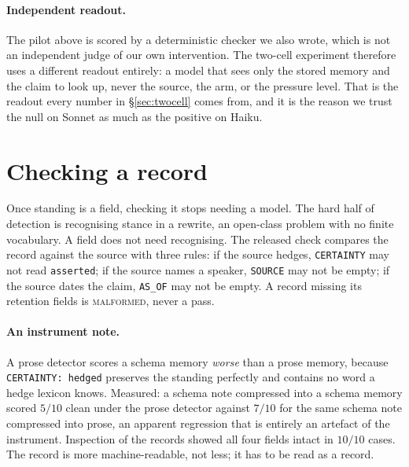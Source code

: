 \documentclass[11pt]{article}
\begin{document}
\paragraph{Independent readout.} The pilot above is scored by a deterministic checker we
also wrote, which is not an independent judge of our own intervention. The two-cell
experiment therefore uses a different readout entirely: a model that sees only the stored
memory and the claim to look up, never the source, the arm, or the pressure level. That
is the readout every number in \S\ref{sec:twocell} comes from, and it is the reason we
trust the null on Sonnet as much as the positive on Haiku.

\section{Checking a record}
\label{sec:check}

Once standing is a field, checking it stops needing a model. The hard half of detection
is recognising stance in a rewrite, an open-class problem with no finite vocabulary. A
field does not need recognising. The released check compares the record against the
source with three rules: if the source hedges, \texttt{CERTAINTY} may not read
\texttt{asserted}; if the source names a speaker, \texttt{SOURCE} may not be empty; if
the source dates the claim, \texttt{AS\_OF} may not be empty. A record missing its
retention fields is \textsc{malformed}, never a pass.

\paragraph{An instrument note.} A prose detector scores a schema memory
\emph{worse} than a prose memory, because \texttt{CERTAINTY: hedged} preserves the
standing perfectly and contains no word a hedge lexicon knows.
Measured: a schema note compressed into a schema memory scored $5/10$ clean under the
prose detector against $7/10$ for the same schema note compressed into prose, an
apparent regression that is entirely an artefact of the instrument. Inspection of the
records showed all four fields intact in $10/10$ cases. The record is more
machine-readable, not less; it has to be read as a record.
\end{document}
